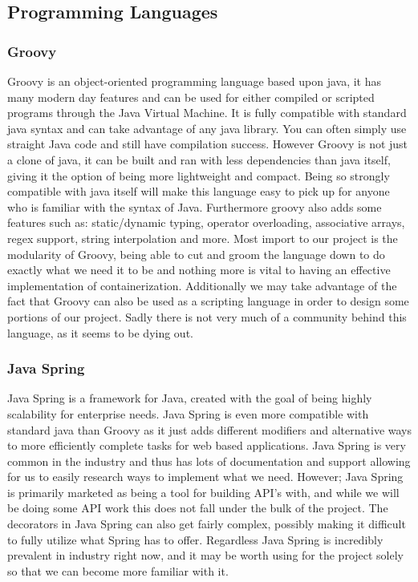 \documentclass[onecolumn, draftclsnofoot,10pt, compsoc]{IEEEtran}
\begin{document}
\subsection{Programming Languages}
\subsubsection{Groovy}
Groovy is an object-oriented programming language based upon java, it has many modern day features and can be used for either compiled or scripted programs through the Java Virtual Machine. It is fully compatible with standard java syntax and can take advantage of any java library. You can often simply use straight Java code and still have compilation success. However Groovy is not just a clone of java, it can be built and ran with less dependencies than java itself, giving it the option of being more lightweight and compact. Being so strongly compatible with java itself will make this language easy to pick up for anyone who is familiar with the syntax of Java. Furthermore groovy also adds some features such as: static/dynamic typing, operator overloading, associative arrays, regex support, string interpolation and more. Most import to our project is the modularity of Groovy, being able to cut and groom the language down to do exactly what we need it to be and nothing more is vital to having an effective implementation of containerization. Additionally we may take advantage of the fact that Groovy can also be used as a scripting language in order to design some portions of our project. Sadly there is not very much of a community behind this language, as it seems to be dying out.
\subsubsection{Java Spring}
Java Spring is a framework for Java, created with the goal of being highly scalability for enterprise needs. Java Spring is even more compatible with standard java than Groovy as it just adds different modifiers and alternative ways to more efficiently complete tasks for web based applications. Java Spring is very common in the industry and thus has lots of documentation and support allowing for us to easily research ways to implement what we need. However; Java Spring is primarily marketed as being a tool for building API's with, and while we will be doing some API work this does not fall under the bulk of the project. The decorators in Java Spring can also get fairly complex, possibly making it difficult to fully utilize what Spring has to offer. Regardless Java Spring is incredibly prevalent in industry right now, and it may be worth using for the project solely so that we can become more familiar with it.
\end{document}
